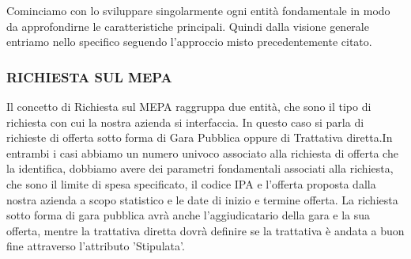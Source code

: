 Cominciamo con lo sviluppare singolarmente ogni entità fondamentale in modo da approfondirne le caratteristiche principali. Quindi dalla visione generale entriamo nello specifico seguendo l'approccio misto precedentemente citato.\newline

\subsubsection{RICHIESTA SUL MEPA}
Il concetto di Richiesta sul MEPA raggruppa due entità, che sono il tipo di richiesta con cui la nostra azienda si interfaccia. In questo caso si parla di richieste di offerta sotto forma di Gara Pubblica oppure di Trattativa diretta.\newline In entrambi i casi abbiamo un numero univoco associato alla richiesta di offerta che la identifica, dobbiamo avere dei parametri fondamentali associati alla richiesta, che sono il limite di spesa specificato, il codice IPA e l'offerta proposta dalla nostra azienda a scopo statistico e le date di inizio e termine offerta.\newline
La richiesta sotto forma di gara pubblica avrà anche l'aggiudicatario della gara e la sua offerta, mentre la trattativa diretta dovrà definire se la trattativa è andata a buon fine attraverso l'attributo 'Stipulata'.\newline\newline
\noindent{}

